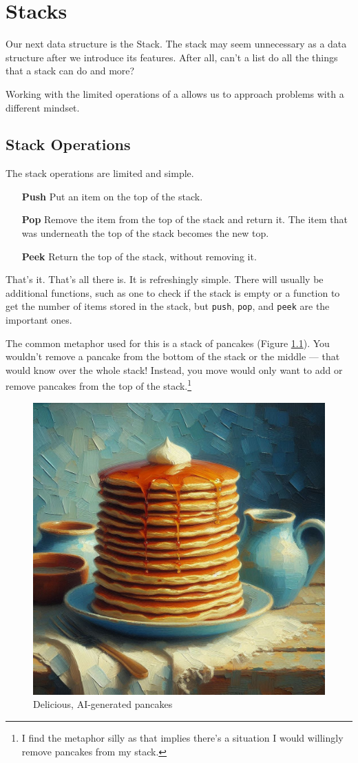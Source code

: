 \chapter{Stacks}
\label{chap:stacks}
Our next data structure is the Stack.
The stack may seem unnecessary as a data structure after we introduce its features.  
After all, can't a list do all the things that a stack can do and more? 

Working with the limited operations of a allows us to approach problems with a different mindset.

\section{Stack Operations}

The stack operations are limited and simple. 

\begin{enumerate}
	\item[\textbf{Push}] Put an item on the top of the stack.
	\item[\textbf{Pop}] Remove the item from the top of the stack and return it.  The item that was underneath the top of the stack becomes the new top.
	\item[\textbf{Peek}] Return the top of the stack, without removing it.
\end{enumerate}


That's it.  That's all there is.  It is refreshingly simple.
There will usually be additional functions, such as one to check if the stack is empty or a function to get the number of items stored in the stack, but \texttt{push}, \texttt{pop}, and \texttt{peek} are the important ones.


The common metaphor used for this is a stack of pancakes (Figure \ref{fig:pancakeai}).  You wouldn't remove a pancake from the bottom of the stack or the middle --- that would know over the whole stack! Instead, you move would only want to add or remove pancakes from the top of the stack.\footnote{I find the metaphor silly as that implies there's a situation I would willingly remove pancakes from my stack.}

\begin{figure}
	\centering
	\includegraphics[width=0.7\linewidth]{pics/pancake_ai}
	\caption[AI Pancakes]{Delicious, AI-generated pancakes}
	\label{fig:pancakeai}
\end{figure}



